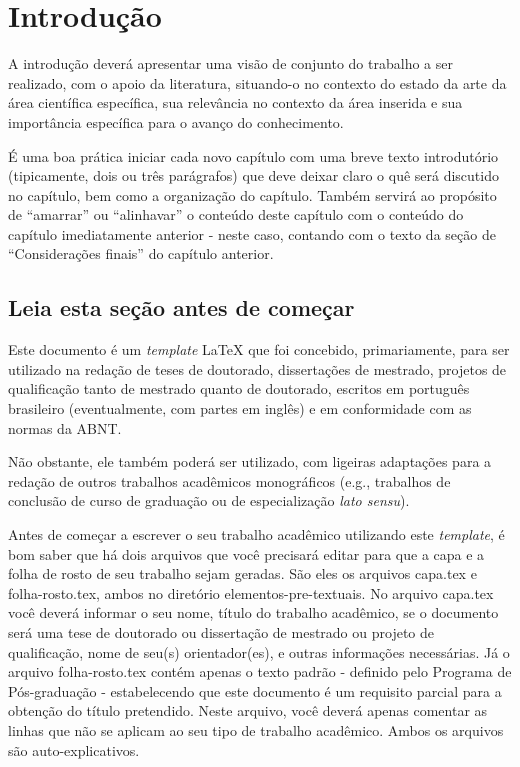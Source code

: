 
\chapter{Introdução}
\label{chap:introducao}

A introdução deverá apresentar uma visão de conjunto do trabalho a ser realizado, com o apoio da literatura, situando-o no contexto do estado da arte da área científica específica, sua relevância no contexto da área inserida e sua importância específica para o avanço do conhecimento.

É uma boa prática iniciar cada novo capítulo com uma breve texto introdutório (tipicamente, dois ou três parágrafos) que deve deixar claro o quê será discutido no capítulo, bem como a organização do capítulo.
Também servirá ao propósito de ``amarrar'' ou ``alinhavar'' o conteúdo deste capítulo com o conteúdo do capítulo imediatamente anterior - neste caso, contando com o texto da seção de ``Considerações finais'' do capítulo anterior.

\section{Leia esta seção antes de começar}
\label{sec:leia_esta_secao_antes_de_omecar}

Este documento é um \emph{template} \LaTeX{} que foi concebido, primariamente, para ser utilizado na redação de teses de doutorado, dissertações de mestrado, projetos de qualificação tanto de mestrado quanto de doutorado, escritos em português brasileiro (eventualmente, com partes em inglês) e em conformidade com as normas da ABNT.

Não obstante, ele também poderá ser utilizado, com ligeiras adaptações para a redação de outros trabalhos acadêmicos monográficos (e.g., trabalhos de conclusão de curso de graduação ou de especialização \emph{lato sensu}).

Antes de começar a escrever o seu trabalho acadêmico utilizando este \emph{template}, é bom saber que há dois arquivos que você precisará editar para que a capa e a folha de rosto de seu trabalho sejam geradas.
São eles os arquivos {\ttfamily capa.tex} e {\ttfamily folha-rosto.tex}, ambos no diretório {\ttfamily elementos-pre-textuais}.
No arquivo {\ttfamily capa.tex} você deverá informar o seu nome, título do trabalho acadêmico, se o documento será uma tese de doutorado ou dissertação de mestrado ou projeto de qualificação, nome de seu(s) orientador(es), e outras informações necessárias.
Já o arquivo {\ttfamily folha-rosto.tex} contém apenas o texto padrão - definido pelo Programa de Pós-graduação - estabelecendo que este documento é um requisito parcial para a obtenção do título pretendido.
Neste arquivo, você deverá apenas comentar as linhas que não se aplicam ao seu tipo de trabalho acadêmico.
Ambos os arquivos são auto-explicativos.

